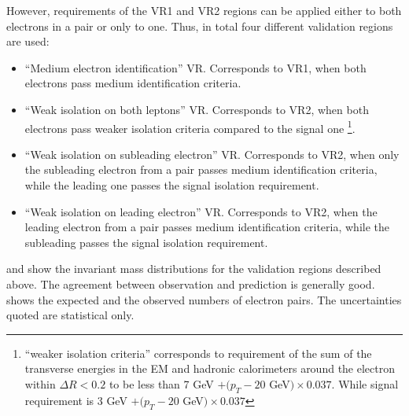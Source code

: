 However, requirements of the VR1 and VR2 regions can be applied either to both electrons in a pair or only to one.
Thus, in total four different validation regions are used:
\begin{itemize}
 \item ``Medium electron identification'' VR. Corresponds to VR1, when both electrons pass medium identification criteria.
 \item ``Weak isolation on both leptons'' VR. Corresponds to VR2, when both electrons pass weaker isolation criteria compared to the signal one 
 \footnote{``weaker isolation criteria'' corresponds to requirement of the sum of the transverse energies in the EM and hadronic calorimeters around the electron within $\Delta R < 0.2$ to be less than 7 GeV $+ (p_T - 20$ GeV$) \times 0.037$.
 While signal requirement is 3 GeV $+ (p_T - 20$ GeV$) \times 0.037$}.
 \item ``Weak isolation on subleading electron'' VR. Corresponds to VR2, when only the subleading electron from a pair passes medium identification criteria, while the leading one passes the signal isolation requirement.
 \item ``Weak isolation on leading electron'' VR. Corresponds to VR2, when the leading electron from a pair passes medium identification criteria, while the subleading passes the signal isolation requirement.
\end{itemize}

 and  show the invariant mass distributions for the validation regions described above. 
The agreement between observation and prediction is generally good.  
 shows the expected and the observed numbers of electron pairs. 
The uncertainties quoted are statistical only. 

